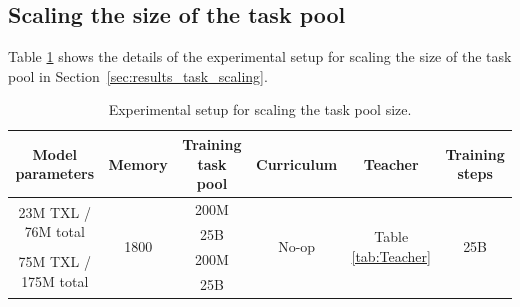 \documentclass[11pt, a4paper, logo, copyright]{deepmind}
\begin{document}
\begin{appendix}
\subsection{Scaling the size of the task pool}
\label{app:task-scaling}
Table \ref{tab:task-scaling} shows the details of the experimental setup for scaling the size of the task pool in Section~\ref{sec:results_task_scaling}.
\begin{table}[h!]
  \begin{center}
    \caption{Experimental setup for scaling the task pool size.}
    \begin{tabular}{c|c|c|c|c|c}
    \label{tab:task-scaling}
      Model parameters & Memory & Training task pool & Curriculum & Teacher & Training steps \\
      \hline
      \multirow{2}{*}{23M TXL / 76M total} & \multirow{4}{*}{1800} & 200M & \multirow{4}{*}{No-op} & \multirow{4}{*}{Table \ref{tab:Teacher}} & \multirow{4}{*}{25B}\\
      && 25B &&&\\
      \multirow{2}{*}{75M TXL / 175M total} &  & 200M & & & \\
      && 25B &&&\\
    \end{tabular}
  \end{center}
\end{table}

\end{appendix}
\end{document}
